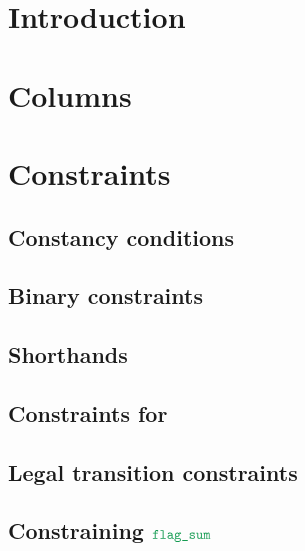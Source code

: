 \section{Introduction}                                                      \label{bls: intro}                                              
\section{Columns}                                                           \label{bls: columns}                                            

\section{Constraints}    
\subsection{Constancy conditions}                                           \label{bls: constancy conditions}                               
\subsection{Binary constraints}                                             \label{bls: binary}                                             
\subsection{Shorthands}                                                     \label{bls: shorthands}                                         
\subsection{Constraints for \blsStamp{}}                                    \label{bls: stamp}                                              
\subsection{Legal transition constraints}                                   \label{bls: legal transitions}                                  
\subsection{Constraining $\locFlagSum$}                                     \label{bls: flag sum}                                           

